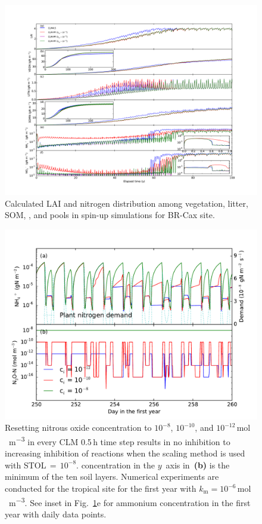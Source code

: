 \documentclass[gmdd, online, hvmath]{copernicus}
\begin{document}
\begin{figure}
\includegraphics[width=120mm]{gmd-2015-254-discussions-f06.pdf}
\caption{Calculated LAI and nitrogen distribution among vegetation, litter, SOM, , and  pools in spin-up simulations for BR-Cax site.}
\label{fig:cax300yl}
\end{figure}


\begin{figure}
\includegraphics[width=120mm]{gmd-2015-254-discussions-f07.pdf}
\caption{Resetting nitrous oxide concentration to $10^{-8}$, $10^{-10}$, and $10^{-12}$\,\unit{mol\,m^{-3}} in every CLM 0.5\,h time step results in no inhibition to increasing inhibition of reactions when the scaling method is used with
STOL\,$=$\,$10^{-8}$.  concentration in the  $y$~axis in~\textbf{(b)} is the minimum of the ten soil layers. Numerical experiments are conducted for the tropical site for the first year with $k_\mathrm{m}=10^{-6}$\,\unit{mol\,m^{-3}}. See inset in Fig.~\ref{fig:cax300yl}e for ammonium concentration in the first year with daily data points.}
\label{fig:cax1yn2o}
\end{figure}
\end{document}
